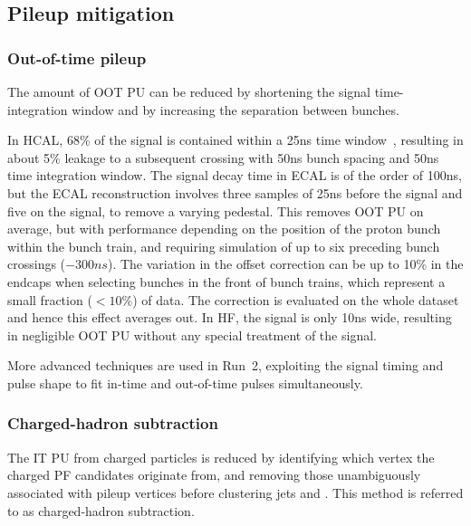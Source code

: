 \documentclass[11pt,twoside,a4paper,cmspaper,final,collab]{cms-tdr}
\begin{document}
\subsection{Pileup mitigation}
\label{subsec:pumitigation}
\subsubsection*{Out-of-time pileup}\label{sec:timeslice}

The amount of OOT PU can be reduced by shortening the signal time-integration window and by increasing the separation between bunches.

In HCAL, 68\% of the signal is contained within a 25\unit{ns} time window~\cite{phystdr1}, resulting in about 5\% leakage to a subsequent crossing with 50\unit{ns} bunch spacing and 50\unit{ns} time integration window.
The signal decay time in ECAL is of the order of 100\unit{ns}, but the ECAL reconstruction involves three samples of 25\unit{ns} before the signal and five on the signal, to remove a varying pedestal. This removes OOT PU on average, but with performance depending on the position of the proton bunch within the bunch train, and requiring simulation of up to six preceding bunch crossings ($-300\unit{ns}$). The variation in the offset correction can be up to 10\% in the endcaps when selecting bunches in the front of bunch trains, which represent a small fraction ($<10\%$) of data. The correction is evaluated on the whole dataset and hence this effect averages out.
In HF, the signal is only 10\unit{ns} wide, resulting in negligible OOT PU without any special treatment of the signal.

More advanced techniques are used in Run~2, exploiting the signal timing and pulse shape to fit in-time and out-of-time pulses simultaneously.

\subsubsection*{Charged-hadron subtraction}\label{sec:chs}

The IT PU from charged particles is reduced by identifying which vertex the charged PF candidates originate from, and removing those unambiguously associated with pileup vertices before clustering jets and \ptvecmiss. This method is referred to as charged-hadron subtraction.
\end{document}
